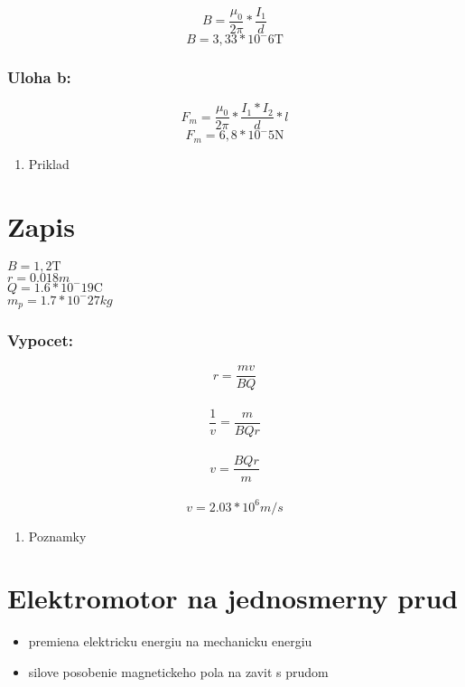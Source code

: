 \documentclass[
]{article}
\providecommand{\tightlist}{%
  \setlength{\itemsep}{0pt}\setlength{\parskip}{0pt}}
\begin{document}
\[B = \frac{\mu_{0}}{2\pi} * \frac{I_1}{d}\]
\[B = 3,33 * 10^-6\si{\tesla}\]

\hypertarget{uloha-b-1}{%
\subsubsection{Uloha b:}\label{uloha-b-1}}

\[F_m = \frac{\mu_0}{2\pi} * \frac{I_1 * I_2}{d} * l\]
\[F_m = 6,8 * 10^-5\si{\newton}\]

\begin{enumerate}
\def\labelenumi{\arabic{enumi}.}
\setcounter{enumi}{2}
\tightlist
\item
  Priklad
\end{enumerate}

\hypertarget{zapis-2}{%
\section{Zapis}\label{zapis-2}}

\(B = 1,2\si{\tesla}\)\\
\(r = 0.018m\)\\
\(Q = 1.6 * 10^-19\si{\coulomb}\)\\
\(m_p = 1.7 * 10^-27 kg\)

\hypertarget{vypocet}{%
\subsubsection{Vypocet:}\label{vypocet}}

\[r = \frac{mv}{BQ}\]\\
\[\frac{1}{v} = \frac{m}{BQr}\]\\
\[v = \frac{BQr}{m}\]\\
\[v = 2.03 * 10^6 m/s\]

\begin{enumerate}
\def\labelenumi{\arabic{enumi}.}
\setcounter{enumi}{3}
\tightlist
\item
  Poznamky
\end{enumerate}

\hypertarget{elektromotor-na-jednosmerny-prud}{%
\section{Elektromotor na jednosmerny
prud}\label{elektromotor-na-jednosmerny-prud}}

\begin{itemize}
\tightlist
\item
  premiena elektricku energiu na mechanicku energiu
\item
  silove posobenie magnetickeho pola na zavit s prudom
\end{itemize}
\end{document}
